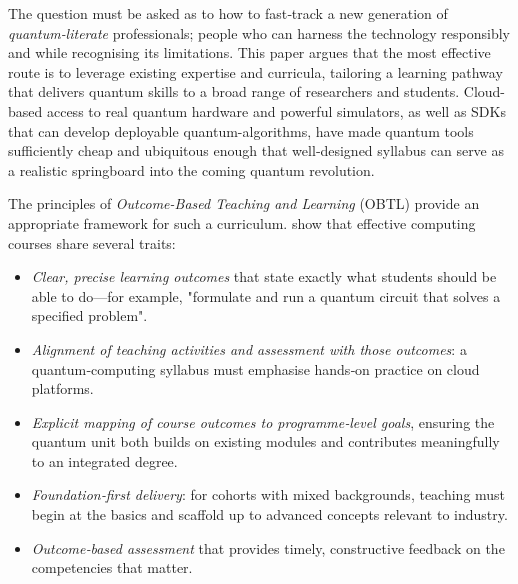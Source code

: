 The question must be asked as to how to fast‑track a new generation of \emph{quantum‑literate} professionals; 
people who can harness the technology responsibly and while recognising its limitations.
This paper argues that the most effective route is to leverage existing expertise and curricula,
tailoring a learning pathway that delivers quantum skills to a broad range of researchers and students.
Cloud-based access to real quantum hardware and powerful simulators, as well as SDKs that can develop deployable quantum-algorithms, 
have made quantum tools sufficiently cheap and ubiquitous enough that 
well‑designed syllabus can serve as a realistic springboard into the coming quantum revolution.

%

The principles of \emph{Outcome-Based Teaching and Learning} (OBTL) provide an appropriate framework for such a curriculum.
\citeauthor{Wong:2011} \cite{Wong:2011} show that
effective computing courses share several traits:
\begin{itemize}
	\item \emph{Clear, precise learning outcomes} that state exactly what students should be able to do—for example, "formulate and run a quantum circuit that solves a specified problem".
	\item \emph{Alignment of teaching activities and assessment with those outcomes}: a quantum‑computing syllabus must emphasise hands‑on practice on cloud platforms.
	\item \emph{Explicit mapping of course outcomes to programme‑level goals}, ensuring the quantum unit both builds on existing modules and contributes meaningfully to an integrated degree.
	\item \emph{Foundation‑first delivery}: for cohorts with mixed backgrounds, teaching must begin at the basics and scaffold up to advanced concepts relevant to industry.
	\item \emph{Outcome‑based assessment} that provides timely, constructive feedback on the competencies that matter.
\end{itemize}

